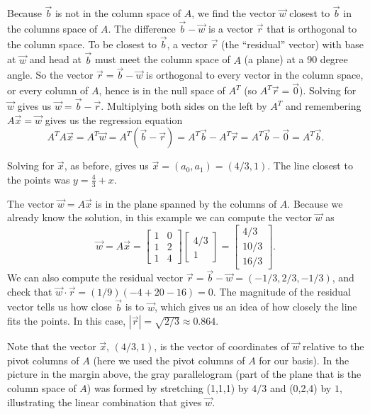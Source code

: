 \begin{example}
{Because $\vec b$ is not in the column space of $A$, we find the vector $\vec w$ closest to $\vec b$ in the columns space of $A$.  The difference $\vec b-\vec w$ is a vector $\vec r$ that is orthogonal to the column space.}%
To be closest to $\vec b$, a vector $\vec r$ (the ``residual'' vector) with base at $\vec w$ and
head at $\vec b$ must meet the column space of $A$ (a plane) at a 90 degree angle.  So the vector $\vec r = \vec b-\vec w$ is orthogonal to every vector in the column space, or every column of $A$, hence is in the null space of $A^T$ (so $A^T\vec r=\vec 0$). Solving for $\vec w$ gives us $\vec w = \vec b-\vec r$.  Multiplying both sides on the left by $A^T$ and remembering $A\vec x = \vec w$ gives us the regression equation
$$A^TA\vec x=A^T\vec w
=A^T(\vec b-\vec r) 
= A^T\vec b - A^T\vec r 
= A^T\vec b - \vec 0 =
A^T\vec b.$$

Solving for $\vec x$, as before, gives us $\vec x = (a_0,a_1)=(4/3,1)$.
The line closest to the points was $y=\frac{4}{3} + x$. 


The vector $\vec w=A\vec x$ is in the plane spanned by the columns of $A$. Because we already know the solution, in this example we can compute the vector $\vec w$ as
$$
\vec w = A \vec x = \begin{bmatrix}1&0\\1&2\\1&4\end{bmatrix}\begin{bmatrix}4/3\\1\end{bmatrix} = \begin{bmatrix}4/3\\10/3\\16/3  \end{bmatrix}.
$$
We can also compute the residual vector $\vec r=\vec b - \vec w=(-1/3,2/3,-1/3)$, and check that $\vec w \cdot \vec r = (1/9)(-4+20-16)=0$.  The magnitude of the residual vector tells us how close $\vec b$ is to $\vec w$, which gives us an idea of how closely the line fits the points.  In this case, $|\vec r|=\sqrt{2/3}\approx 0.864$.

Note that the vector $\vec x$, $(4/3,1)$, is the vector of coordinates of $\vec w$ relative to the pivot columns of $A$ (here we used the pivot columns of $A$ for our basis).  In the picture in the margin above, the gray parallelogram (part of the plane that is the column space of $A$) was formed by stretching (1,1,1) by $4/3$ and (0,2,4) by $1$, illustrating the linear combination that gives $\vec w$.  


\end{example}
